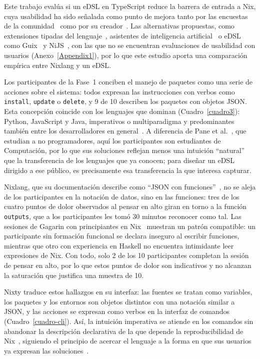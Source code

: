 Este trabajo evalúa si un eDSL en TypeScript reduce la barrera de entrada a Nix, cuya usabilidad ha sido señalada como punto de mejora tanto por las encuestas de la comunidad~\cite{2022NixSurvey2022,2025CommunitySurvey,NixCommunitySurvey2023,NixCommunitySurvey2024} como por su creador~\cite{Dolstra2018}. Las alternativas propuestas, como extensiones tipadas del lenguaje~\cite{caddetNixNickel,hufschmittCurrentStatePtyx}, asistentes de inteligencia artificial~\cite{Schwaighofer2026} o eDSL como Guix~\cite{Courts2013} y NiJS~\cite{burgNiJSInternalDSL2026}, con las que no se encuentran evaluaciones de usabilidad con usuarios (Anexo~\ref{Appendix1}), por lo que este estudio aporta una comparación empírica entre Nixlang y un eDSL.

Los participantes de la Fase~1 conciben el manejo de paquetes como una serie de acciones sobre el sistema: todos expresan las instrucciones con verbos como \texttt{install}, \texttt{update} o \texttt{delete}, y 9 de 10 describen los paquetes con objetos JSON. Esta concepción coincide con los lenguajes que dominan (Cuadro~\ref{cuadro3}): Python, JavaScript y Java, imperativos o multiparadigma y predominantes también entre los desarrolladores en general~\cite{stackoverflowMostPopularTechnologies}. A diferencia de Pane et al.~\cite{paneStudyingLanguageStructure2001}, que estudian a no programadores, aquí los participantes son estudiantes de Computación, por lo que sus soluciones reflejan menos una intuición ``natural'' que la transferencia de los lenguajes que ya conocen; para diseñar un eDSL dirigido a ese público, es precisamente esa transferencia la que interesa capturar.

Nixlang, que su documentación describe como ``JSON con funciones''~\cite{NixdevDocumentation}, no se aleja de los participantes en la notación de datos, sino en las funciones: tres de los cuatro puntos de dolor observados al pensar en alto giran en torno a la función \texttt{outputs}, que a los participantes les tomó 30 minutos reconocer como tal. Las sesiones de Gagarin con principiantes en Nix~\cite{fricklerhandwerk2022} muestran un patrón compatible: un participante sin formación funcional se declara inseguro al escribir funciones, mientras que otro con experiencia en Haskell no encuentra intimidante leer expresiones de Nix. Con todo, solo 2 de los 10 participantes completan la sesión de pensar en alto, por lo que estos puntos de dolor son indicativos y no alcanzan la saturación que justifica una muestra de 10.

Nixty traduce estos hallazgos en su interfaz: las fuentes se tratan como variables, los paquetes y los entornos son objetos distintos con una notación similar a JSON, y las acciones se expresan como verbos en la interfaz de comandos (Cuadro~\ref{cuadro-cli}). Así, la intuición imperativa se atiende en los comandos sin abandonar la descripción declarativa de la que depende la reproducibilidad de Nix~\cite{Dolstra2006}, siguiendo el principio de acercar el lenguaje a la forma en que sus usuarios ya expresan las soluciones~\cite{panePDFMoreNatural2006}.

